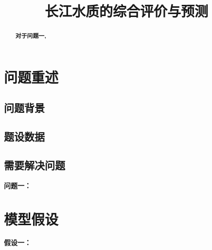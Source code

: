 \documentclass[withoutpreface,bwprint]{cumcmthesis}
\title{长江水质的综合评价与预测}
\begin{document}
\maketitle
\thispagestyle{empty}
\begin{abstract}



\textbf{对于问题一,}


   \keywords{} 

\end{abstract}


\section{问题重述}

\subsection{问题背景}



\subsection{题设数据}






\subsection{需要解决问题}

\textbf{问题一：}



\section{模型假设}
\textbf{假设一：}





\newpage
\end{document}
